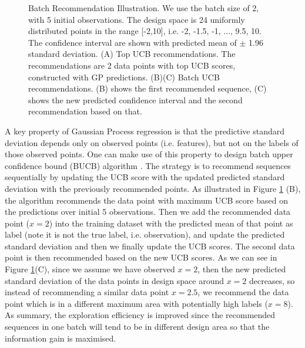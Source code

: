 \begin{figure}
\begin{subfigure}[b]{0.49\textwidth}
    \end{subfigure}
    \caption{Batch Recommendation Illustration. We use the batch size of 2, with 5 initial observations. The design space is 24 uniformly distributed points in the range [-2,10], i.e. {-2, -1.5, -1, ..., 9.5, 10}.
    The confidence interval are shown with predicted mean of $\pm$ 1.96 standard deviation.
    (A) Top UCB recommendations. The recommendations are 2 data points with top UCB scores, constructed with GP predictions. 
    (B)(C) Batch UCB recommendations. (B) shows the first recommended sequence, (C) shows the new predicted confidence interval and the second recommendation based on that.}
    \label{fig:batch rec}
\end{figure}


A key property of Gaussian Process regression is that the predictive standard deviation depends only on observed points (i.e. features), but not on the labels of those observed points. 
One can make use of this property to design batch upper confidence bound (BUCB) algorithm \cite{desautels2014parallelizing}.
The strategy is to recommend sequences sequentially by updating the UCB score with the updated predicted standard deviation with the previously recommended points.
As illustrated in Figure \ref{fig:batch rec} (B), the algorithm recommends the data point with maximum UCB score based on the predictions over initial 5 observations.  
Then we add the recommended data point ($x = 2$) into the training dataset with the predicted mean of that point as label (note it is not the true label, i.e. observation), and update the predicted standard deviation and then we finally update the UCB scores. 
The second data point is then recommended based on the new UCB scores.   
As we can see in Figure \ref{fig:batch rec}(C), since we assume we have observed $x = 2$, then the new predicted standard deviation of the data points in design space around $x =2$  decreases, so instead of recommending a similar data point $x = 2.5$, we recommend the data point which is in a different maximum area with potentially high labels ($x = 8$).     
As summary, the exploration efficiency is improved since the recommended sequences in one batch will tend to be in different design area so that the information gain is maximised. 
